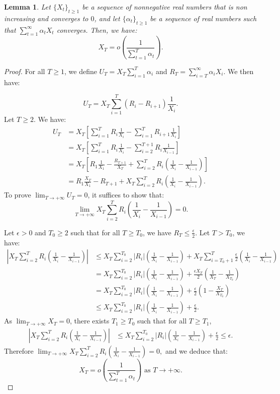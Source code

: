 \documentclass{article} %
\newtheorem{lemma}{Lemma}
\begin{document}
\begin{lemma}\label{Lem_Reb} 
 Let \( \{X_t\}_{t \ge 1} \) be a sequence of nonnegative real numbers that is non increasing and converges to \( 0 \), and let \( \{\alpha_t\}_{t \ge 1} \) be a sequence of real numbers such that  \( \sum_{t=1}^{\infty} \alpha_t X_t \) converges. Then, we have:
\[
X_T = o\left( \frac{1}{\sum_{t=1}^T \alpha_t} \right).
\]


\end{lemma}
\begin{proof}
    For all $T \ge 1$, we define $U_T=X_T \sum_{i=1}^T \alpha_i$ and $R_T=\sum_{i=T}^{\infty} \alpha_i X_i.$ We then have:
 
 $$
    U_T=X_T\sum_{i=1}^T (R_{i}-R_{i+1})\frac{1}{X_i} .
  $$
 Let $T \ge 2.$ We have:
 \begin{align*}
      U_T&=X_T \left[ \sum_{i=1}^T R_i\frac{1}{X_i}-\sum_{i=1}^T R_{i+1}\frac{1}{X_i}  \right]\\
      &= X_T \left[ \sum_{i=1}^T R_i\frac{1}{X_i}-\sum_{i=2}^{T+1} R_i\frac{1}{X_{i-1}}   \right]\\
      &= X_T \left[ R_1 \frac{1}{X_1}-\frac{R_{T+1}}{X_{T}} +\sum_{i=2}^T R_i (\frac{1}{X_i}-\frac{1}{X_{i-1}})  \right]\\
      &=R_1 \frac{X_T}{X_1}-R_{T+1}+X_T \sum_{i=2}^T R_i (\frac{1}{X_i}-\frac{1}{X_{i-1}}).
 \end{align*}
 To prove \( \lim_{T \to +\infty} U_T = 0 \), it suffices to show that:
\[
\lim_{T \to +\infty} X_T \sum_{i=2}^T R_i (\frac{1}{X_i}-\frac{1}{X_{i-1}}) = 0.
\]

Let $\epsilon>0$ and $T_0 \ge 2$ such that for all $T \ge T_0$, we have $ R_T  \le \frac{\epsilon}{2}$. Let $T > T_0$, we have:
 \begin{align*}
 \left| X_T \sum_{i=2}^T R_i (\frac{1}{X_i}-\frac{1}{X_{i-1}})    \right| &\le X_T \sum_{i=2}^{T_0} |R_i|(\frac{1}{X_i}-\frac{1}{X_{i-1}}) +X_T\sum_{i=T_0+1}^{T} \frac{\epsilon}{2} (\frac{1}{X_i}-\frac{1}{X_{i-1}})
 \\
 &= X_T \sum_{i=2}^{T_0} |R_i|(\frac{1}{X_i}-\frac{1}{X_{i-1}}) + \frac{\epsilon X_T}{2}  (\frac{1}{X_T}-\frac{1}{X_{T_0}})
  \\
 &= X_T \sum_{i=2}^{T_0} |R_i|(\frac{1}{X_i}-\frac{1}{X_{i-1}}) + \frac{\epsilon}{2} (1-\frac{X_T}{X_{T_0}})
 \\&\le X_T \sum_{i=2}^{T_0} |R_i|(\frac{1}{X_i}-\frac{1}{X_{i-1}}) + \frac{\epsilon}{2}.
 \end{align*}
As $\lim_{T \to +\infty} X_T=0$, there exists $T_1 \ge T_0$ such that for all $T \ge T_1$,
 \begin{align*}
 \left| X_T \sum_{i=2}^T R_i (\frac{1}{X_i}-\frac{1}{X_{i-1}})    \right| 
 &\le X_T \sum_{i=2}^{T_0} |R_i|(\frac{1}{X_i}-\frac{1}{X_{i-1}}) + \frac{\epsilon }{2}\le \epsilon.
 \end{align*}
 Therefore $\lim_{T \to +\infty} X_T \sum_{i=2}^T R_i (\frac{1}{X_i}-\frac{1}{X_{i-1}}) = 0,$ and we deduce that: \[
X_T = o\left( \frac{1}{\sum_{t=1}^T \alpha_t} \right) \text{ as } T \to +\infty.
\]
\end{proof}
\end{document}
